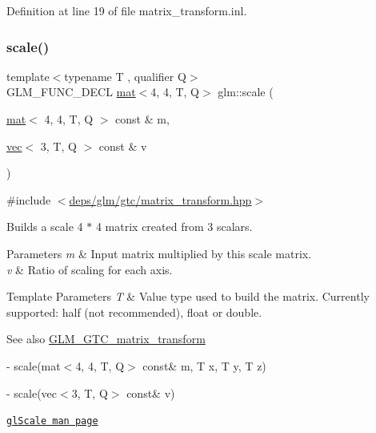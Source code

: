 Definition at line 19 of file matrix\+\_\+transform.\+inl.

\mbox{\label{group__gtc__matrix__transform_ga05051adbee603fb3c5095d8cf5cc229b}} 
\subsubsection{\texorpdfstring{scale()}{scale()}}
{\footnotesize\ttfamily template$<$typename T , qualifier Q$>$ \\
G\+L\+M\+\_\+\+F\+U\+N\+C\+\_\+\+D\+E\+CL \hyperlink{structglm_1_1mat}{mat}$<$4, 4, T, Q$>$ glm\+::scale (\begin{DoxyParamCaption}\item[{\hyperlink{structglm_1_1mat}{mat}$<$ 4, 4, T, Q $>$ const \&}]{m,  }\item[{\hyperlink{structglm_1_1vec}{vec}$<$ 3, T, Q $>$ const \&}]{v }\end{DoxyParamCaption})}



{\ttfamily \#include $<$\hyperlink{matrix__transform_8hpp}{deps/glm/gtc/matrix\+\_\+transform.\+hpp}$>$}

Builds a scale 4 $\ast$ 4 matrix created from 3 scalars.


\begin{DoxyParams}{Parameters}
{\em m} & Input matrix multiplied by this scale matrix. \\
\hline
{\em v} & Ratio of scaling for each axis. \\
\hline
\end{DoxyParams}

\begin{DoxyTemplParams}{Template Parameters}
{\em T} & Value type used to build the matrix. Currently supported\+: half (not recommended), float or double. \\
\hline
\end{DoxyTemplParams}
\begin{DoxySeeAlso}{See also}
\hyperlink{group__gtc__matrix__transform}{G\+L\+M\+\_\+\+G\+T\+C\+\_\+matrix\+\_\+transform} 

-\/ scale(mat$<$4, 4, T, Q$>$ const\& m, T x, T y, T z) 

-\/ scale(vec$<$3, T, Q$>$ const\& v) 

\href{https://www.khronos.org/registry/OpenGL-Refpages/gl2.1/xhtml/glScale.xml}{\tt gl\+Scale man page} 
\end{DoxySeeAlso}


